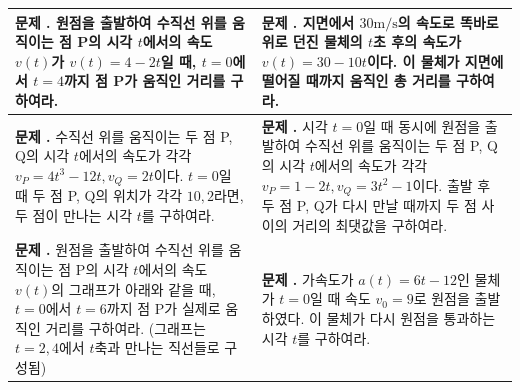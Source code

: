 \documentclass[10pt, a4paper]{article} %
\newcounter{probcount}
\newcommand{\exercise}[1]{%
    \stepcounter{probcount}%
    \begin{minipage}[t][110mm][t]{0.44\textwidth}
        \small %
        \vspace{1mm}
        \noindent \textbf{문제 \arabic{probcount}.} #1
    \end{minipage}%
}
\begin{document}
\noindent
\begin{longtable}{p{} | p{}}
    
    \exercise{원점을 출발하여 수직선 위를 움직이는 점 P의 시각 $t$에서의 속도 $v(t)$가 $v(t)=4-2t$일 때, $t=0$에서 $t=4$까지 점 P가 움직인 거리를 구하여라.} 
    & 
    \exercise{지면에서 $30\text{m/s}$의 속도로 똑바로 위로 던진 물체의 $t$초 후의 속도가 $v(t)=30-10t$이다. 이 물체가 지면에 떨어질 때까지 움직인 총 거리를 구하여라.} \\
    \hline
    
    \exercise{수직선 위를 움직이는 두 점 P, Q의 시각 $t$에서의 속도가 각각 $v_P=4t^3-12t, v_Q=2t$이다. $t=0$일 때 두 점 P, Q의 위치가 각각 $10, 2$라면, 두 점이 만나는 시각 $t$를 구하여라.} 
    & 
    \exercise{시각 $t=0$일 때 동시에 원점을 출발하여 수직선 위를 움직이는 두 점 P, Q의 시각 $t$에서의 속도가 각각 $v_P = 1-2t, v_Q = 3t^2-1$이다. 출발 후 두 점 P, Q가 다시 만날 때까지 두 점 사이의 거리의 최댓값을 구하여라.} \\
    
    \exercise{원점을 출발하여 수직선 위를 움직이는 점 P의 시각 $t$에서의 속도 $v(t)$의 그래프가 아래와 같을 때, $t=0$에서 $t=6$까지 점 P가 실제로 움직인 거리를 구하여라. (그래프는 $t=2, 4$에서 $t$축과 만나는 직선들로 구성됨)} 
    & 
    \exercise{    가속도가 $a(t)=6t-12$인 물체가 $t=0$일 때 속도 $v_0=9$로 원점을 출발하였다. 이 물체가 다시 원점을 통과하는 시각 $t$를 구하여라.} \\
    \hline %

    
\end{longtable}
\end{document}
